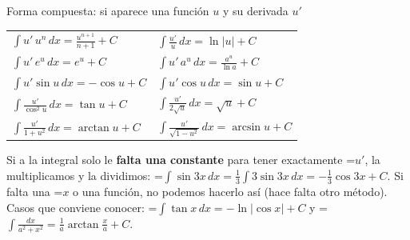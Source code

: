 \documentclass[11pt,a4paper]{article}
\newcommand{\fmm}[1]{\setbox0=\hbox{$#1$}\ifdim\wd0>\linewidth\fmdisp{#1}\else\mbox{\box0}\fi}
\newcommand{\fmdisp}[1]{\[\setbox2=\hbox{$\displaystyle #1$}\ifdim\wd2>\linewidth\resizebox{\linewidth}{!}{\box2}\else\box2\fi\]}
\begin{document}
\begin{fmdef}{Forma compuesta: si aparece una función $u$ y su derivada $u'$}
\begin{center}\renewcommand{\arraystretch}{1.5}\small\begin{tabularx}{\linewidth}{>{\raggedright\arraybackslash}p{7.2cm}>{\raggedright\arraybackslash}X}\toprule
$\displaystyle\int u'\,u^n\,dx=\frac{u^{n+1}}{n+1}+C$ & $\displaystyle\int\frac{u'}{u}\,dx=\ln|u|+C$\\[3pt]
$\displaystyle\int u'\,e^u\,dx=e^u+C$ & $\displaystyle\int u'\,a^u\,dx=\frac{a^u}{\ln a}+C$\\[3pt]
$\displaystyle\int u'\sin u\,dx=-\cos u+C$ & $\displaystyle\int u'\cos u\,dx=\sin u+C$\\[3pt]
$\displaystyle\int\frac{u'}{\cos^2u}\,dx=\tan u+C$ & $\displaystyle\int\frac{u'}{2\sqrt u}\,dx=\sqrt u+C$\\[3pt]
$\displaystyle\int\frac{u'}{1+u^2}\,dx=\arctan u+C$ & $\displaystyle\int\frac{u'}{\sqrt{1-u^2}}\,dx=\arcsin u+C$\\[3pt]
\bottomrule\end{tabularx}\end{center}

Si a la integral solo le \textbf{falta una constante} para tener exactamente \fmm{u'}, la multiplicamos y la dividimos: \fmm{\int\sin3x\,dx=\frac13\int3\sin3x\,dx=-\frac13\cos3x+C}. Si falta una \fmm{x} o una función, no podemos hacerlo así (hace falta otro método). Casos que conviene conocer: \fmm{\int\tan x\,dx=-\ln|\cos x|+C} y \fmm{\int\frac{dx}{a^2+x^2}=\frac1a\arctan\frac xa+C}.
\end{fmdef}
\end{document}
